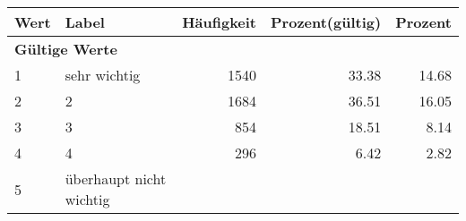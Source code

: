      \begin{longtable}{lXrrr}
     \toprule
     \textbf{Wert} & \textbf{Label} & \textbf{Häufigkeit} & \textbf{Prozent(gültig)} & \textbf{Prozent} \\
     \endhead
     \midrule
     \multicolumn{5}{l}{\textbf{Gültige Werte}}\\

     1 &
     \multicolumn{1}{X}{ sehr wichtig   } &


       \num{1540} &
       \num[round-mode=places,round-precision=2]{33.38} &
         \num[round-mode=places,round-precision=2]{14.68} \\

     2 &
     \multicolumn{1}{X}{ 2   } &


       \num{1684} &
       \num[round-mode=places,round-precision=2]{36.51} &
         \num[round-mode=places,round-precision=2]{16.05} \\

     3 &
     \multicolumn{1}{X}{ 3   } &


       \num{854} &
       \num[round-mode=places,round-precision=2]{18.51} &
         \num[round-mode=places,round-precision=2]{8.14} \\

     4 &
     \multicolumn{1}{X}{ 4   } &


       \num{296} &
       \num[round-mode=places,round-precision=2]{6.42} &
         \num[round-mode=places,round-precision=2]{2.82} \\

     5 &
     \multicolumn{1}{X}{ überhaupt nicht wichtig   } &



\end{longtable}

